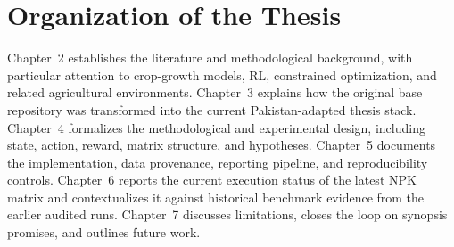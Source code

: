 \section{Organization of the Thesis}

Chapter~2 establishes the literature and methodological background, with particular attention to crop-growth models, RL, constrained optimization, and related agricultural environments. Chapter~3 explains how the original base repository was transformed into the current Pakistan-adapted thesis stack. Chapter~4 formalizes the methodological and experimental design, including state, action, reward, matrix structure, and hypotheses. Chapter~5 documents the implementation, data provenance, reporting pipeline, and reproducibility controls. Chapter~6 reports the current execution status of the latest NPK matrix and contextualizes it against historical benchmark evidence from the earlier audited runs. Chapter~7 discusses limitations, closes the loop on synopsis promises, and outlines future work.
